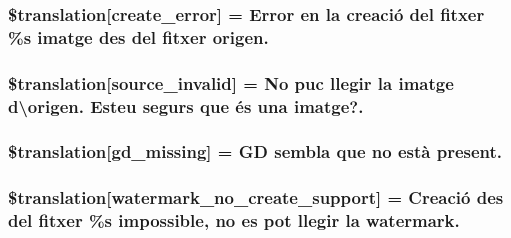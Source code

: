 \subsubsection[{\$translation}]{\setlength{\rightskip}{0pt plus 5cm}\$translation\mbox{[}\textquotesingle{}create\+\_\+error\textquotesingle{}\mbox{]} = \textquotesingle{}Error en la creació del fitxer \%s imatge des del fitxer origen.\textquotesingle{}}\label{class_8upload_8ca___c_a_8php_a53013ce9255c4e1849098ddd9fdb2b3f}
\hypertarget{class_8upload_8ca___c_a_8php_a6ab0a660b457eaf2d3434b225449fdd6}{}
\subsubsection[{\$translation}]{\setlength{\rightskip}{0pt plus 5cm}\$translation\mbox{[}\textquotesingle{}source\+\_\+invalid\textquotesingle{}\mbox{]} = \textquotesingle{}No puc llegir la imatge d\textbackslash{}\textquotesingle{}origen. Esteu segurs que és una imatge?.\textquotesingle{}}\label{class_8upload_8ca___c_a_8php_a6ab0a660b457eaf2d3434b225449fdd6}
\hypertarget{class_8upload_8ca___c_a_8php_a7f3dfcc0db4bbc0f2e7210c439798e56}{}
\subsubsection[{\$translation}]{\setlength{\rightskip}{0pt plus 5cm}\$translation\mbox{[}\textquotesingle{}gd\+\_\+missing\textquotesingle{}\mbox{]} = \textquotesingle{}G\+D sembla que no està present.\textquotesingle{}}\label{class_8upload_8ca___c_a_8php_a7f3dfcc0db4bbc0f2e7210c439798e56}
\hypertarget{class_8upload_8ca___c_a_8php_a82d5853430ab72dc1f9799ec36144cc6}{}
\subsubsection[{\$translation}]{\setlength{\rightskip}{0pt plus 5cm}\$translation\mbox{[}\textquotesingle{}watermark\+\_\+no\+\_\+create\+\_\+support\textquotesingle{}\mbox{]} = \textquotesingle{}Creació des del fitxer \%s impossible, no es pot llegir la watermark.\textquotesingle{}}\label{class_8upload_8ca___c_a_8php_a82d5853430ab72dc1f9799ec36144cc6}
\hypertarget{class_8upload_8ca___c_a_8php_aabca0b65dadbc6184415c16375f284ca}{}
